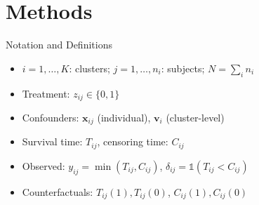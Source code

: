 \documentclass{beamer}
\begin{document}
\section{Methods}

\begin{frame}{Notation and Definitions}
  \begin{itemize}
    \vfill \item \(i = 1,\dots,K\): clusters; \(j = 1,\dots,n_i\): subjects; \(N = \sum_i n_i\)
    \vfill \item Treatment: \(z_{ij} \in \{0,1\}\)
    \vfill \item Confounders: \(\mathbf{x}_{ij}\) (individual), \(\mathbf{v}_i\) (cluster-level)
    \vfill \item Survival time: \(T_{ij}\), censoring time: \(C_{ij}\)
    \vfill \item Observed: \(y_{ij} = \min(T_{ij}, C_{ij})\), \(\delta_{ij} = \mathds{1}(T_{ij} < C_{ij})\)
    \vfill \item Counterfactuals: \(T_{ij}(1), T_{ij}(0)\), \(C_{ij}(1), C_{ij}(0)\)
  \end{itemize}
\end{frame}
\end{document}
